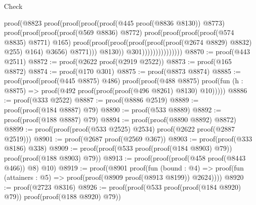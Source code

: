 \begin{lexlean}{Check}
\begin{coremodule}
                                                  proof(@8823
                                                      proof(proof(proof(proof(@445
                                                                proof(@8836 @8130))
                                                              @8773)
                                                            proof(proof(proof(proof(@569 @8836)
                                                                    @8772)
                                                                  proof(proof(proof(proof(@574
                                                                            @8835)
                                                                          @8771)
                                                                        @165)
                                                                      proof(proof(proof(proof(proof(proof(@2674
                                                                                    @8829)
                                                                                  @8832)
                                                                                @255)
                                                                              @164)
                                                                            @3656)
                                                                          @8771)))
                                                                @8130))
                                                          @301)))))))))))))))
@8870 := proof(@443 @2511)
@8872 := proof(@2622 proof(@2919 @2522))
@8873 := proof(@165 @8872)
@8874 := proof(@170 @301)
@8875 := proof(@8873 @8874)
@8885 := proof(proof(proof(@445 @8875) @486)
      proof(proof(@488 @8875)
          proof(fun (h : @8875) => proof(@492 proof(proof(proof(@496 @8261) @8130) @10)))))
@8886 := proof(@333 @2522)
@8887 := proof(@8886 @2519)
@8889 := proof(proof(@184 @8887) @79)
@8890 := proof(@533 @8889)
@8892 := proof(proof(@188 @8887) @79)
@8894 := proof(proof(@8890 @8892) @8872)
@8899 := proof(proof(proof(@533 @2525) @2534) proof(@2622 proof(@2887 @2519)))
@8901 := proof(@2687 proof(@2569 @367))
@8903 := proof(proof(@333 @8186) @338)
@8909 := proof(proof(@533 proof(proof(@184 @8903) @79)) proof(proof(@188 @8903) @79))
@8913 := proof(proof(proof(@458 proof(@8443 @466)) @8) @10)
@8919 := proof(@8901
      proof(fun (bound : @4) =>
        proof(fun (attainers : @5) => proof(proof(@8909 proof(@8913 @8199)) @2624))))
@8920 := proof(@2723 @8316)
@8926 := proof(proof(@533 proof(proof(@184 @8920) @79)) proof(proof(@188 @8920) @79))

\end{coremodule}
\end{lexlean}
